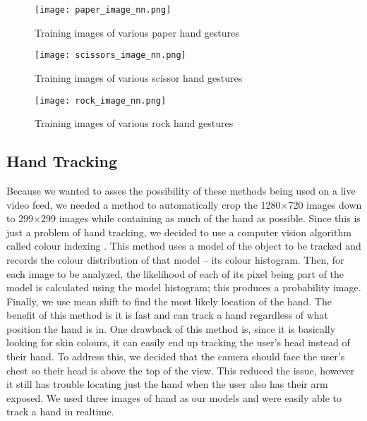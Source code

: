 \begin{figure}[h]
\texttt{[image: paper\_image\_nn.png]}
\centering
\caption{Training images of various paper hand gestures}
\end{figure}

\begin{figure}[h]
\texttt{[image: scissors\_image\_nn.png]}
\centering
\caption{Training images of various scissor hand gestures}
\end{figure}

\begin{figure}[h]
\texttt{[image: rock\_image\_nn.png]}
\centering
\caption{Training images of various rock hand gestures}
\end{figure}

\subsection{Hand Tracking}
Because we wanted to asses the possibility of these methods being used on a live video feed, we needed a method to automatically crop the 1280$\times$720 images down to 299$\times$299 images while containing as much of the hand as possible. Since this is just a problem of hand tracking, we decided to use a computer vision algorithm called colour indexing \cite{swain}. This method uses a model of the object to be tracked and records the colour distribution of that model -- its colour histogram. Then, for each image to be analyzed, the likelihood of each of its pixel being part of the model is calculated using the model histogram; this produces a probability image. Finally, we use mean shift to find the most likely location of the hand. The benefit of this method is it is fast and can track a hand regardless of what position the hand is in. One drawback of this method is, since it is basically looking for skin colours, it can easily end up tracking the user's head instead of their hand. To address this, we decided that the camera should face the user's chest so their head is above the top of the view. This reduced the issue, however it still has trouble locating just the hand when the user also has their arm exposed. We used three images of hand as our models and were easily able to track a hand in realtime. 